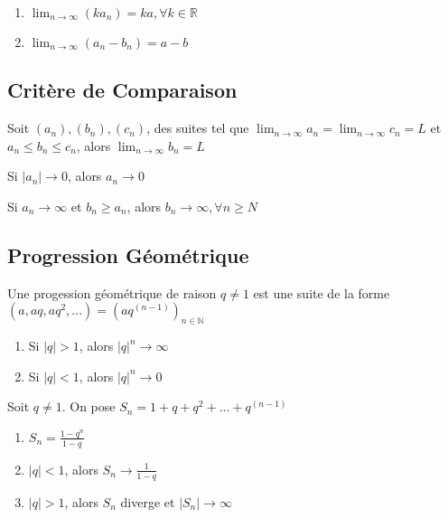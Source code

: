 \documentclass{article}
\begin{document}
\begin{corollary}
    \begin{enumerate}
	\item $\lim_{n \to \infty} (k a_n) =ka , \forall k \in \mathbb{R}$
	\item $\lim_{n \to \infty} (a_n - b_n) = a-b$
    \end{enumerate}
\end{corollary}

\subsection{Critère de Comparaison}

\begin{theorem}
    Soit $(a_n), (b_n), (c_n)$, des suites tel que $\lim_{n \to \infty} a_n =
    \lim_{n \to \infty} c_n = L$ et $a_n \leq b_n \leq c_n$, alors
    $\lim_{n \to \infty} b_n = L$
\end{theorem}

\begin{corollary}
    Si $|a_n| \rightarrow 0$, alors $a_n \rightarrow 0$
\end{corollary}

\begin{theorem}
    Si $a_n \rightarrow \infty$ et $ b_n \geq a_n$, alors $b_n \rightarrow \infty,
    \forall n \geq N$
\end{theorem}

\subsection{Progression Géométrique}

\begin{definition}
    Une progession géométrique de raison $q \neq 1$ est une suite de la forme
    $(a, aq, aq^2, ...) = (aq^(n-1))_{n \in \mathbb{N}}$
\end{definition}

\begin{theorem}
    \begin{enumerate}
	\item Si $|q| >1$, alors $|q|^n \rightarrow \infty$
	\item Si $|q| <1$, alors $|q|^n \rightarrow 0$
    \end{enumerate}
\end{theorem}

\begin{theorem}
    Soit $q \neq 1$. On pose $S_n = 1 + q + q^2 + ... + q^(n-1)$
    \begin{enumerate}
	\item $S_n = \frac{1 - q^n}{1-q}$
	\item $|q|<1$, alors $S_n \rightarrow \frac{1}{1-q}$
	\item $|q|>1$, alors $S_n$ diverge et $|S_n| \rightarrow \infty$
    \end{enumerate}
\end{theorem}
\end{document}
